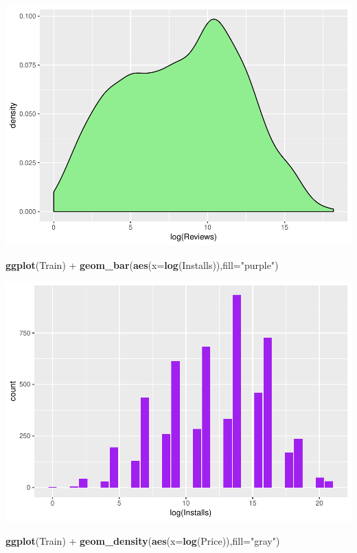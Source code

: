 \documentclass[]{article}
\newenvironment{Shaded}{\begin{snugshade}}{\end{snugshade}}
\newcommand{\KeywordTok}[1]{\textcolor[rgb]{0.13,0.29,0.53}{\textbf{{#1}}}}
\newcommand{\DataTypeTok}[1]{\textcolor[rgb]{0.13,0.29,0.53}{{#1}}}
\newcommand{\StringTok}[1]{\textcolor[rgb]{0.31,0.60,0.02}{{#1}}}
\newcommand{\NormalTok}[1]{{#1}}
\begin{document}
\includegraphics{Project_2_Work_files/figure-latex/unnamed-chunk-15-3.pdf}

\begin{Shaded}
\begin{Highlighting}[]
\KeywordTok{ggplot}\NormalTok{(Train) +}\StringTok{ }\KeywordTok{geom_bar}\NormalTok{(}\KeywordTok{aes}\NormalTok{(}\DataTypeTok{x=}\KeywordTok{log}\NormalTok{(Installs)),}\DataTypeTok{fill=}\StringTok{"purple"}\NormalTok{)}
\end{Highlighting}
\end{Shaded}

\includegraphics{Project_2_Work_files/figure-latex/unnamed-chunk-15-4.pdf}

\begin{Shaded}
\begin{Highlighting}[]
\KeywordTok{ggplot}\NormalTok{(Train) +}\StringTok{ }\KeywordTok{geom_density}\NormalTok{(}\KeywordTok{aes}\NormalTok{(}\DataTypeTok{x=}\KeywordTok{log}\NormalTok{(Price)),}\DataTypeTok{fill=}\StringTok{"gray"}\NormalTok{)}
\end{Highlighting}
\end{Shaded}
\end{document}
